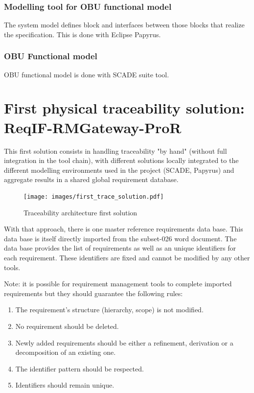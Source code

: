 \documentclass[11pt]{template/openetcs_report}
\begin{document}
\subsection{Modelling tool for OBU functional model}
The system model defines block and interfaces between those blocks that realize
the specification. This is done with Eclipse Papyrus. 

\subsection{OBU Functional model}
\label{sec-10}
OBU functional model is done with SCADE suite tool.

\chapter{First physical traceability solution: ReqIF-RMGateway-ProR}
\label{sec-5}

This first solution consists in handling traceability "by hand" (without full integration in the tool chain), with different solutions locally integrated to the different modelling environments used in the project (SCADE, Papyrus) and aggregate results in a shared global requirement database.

\begin{figure}[htb]
\centering
\texttt{[image: images/first\_trace\_solution.pdf]}
\caption{\label{fig:trace_first}Traceability architecture first solution}
\end{figure}

With that approach, there is one master reference requirements data base. This data
base is itself directly imported from the subset-026 word document. The data
base provides the list of requirements as well as an unique identifiers for each
requirement. These identifiers are fixed and cannot be modified by any other
tools. 

Note: it is possible for requirement management tools to complete imported
requirements but they should guarantee the following rules:
\begin{enumerate}
\item The requirement's structure (hierarchy, scope) is not modified.
\item No requirement should be deleted.
\item Newly added requirements should be either a refinement, derivation or a decomposition of an existing one.
\item The identifier pattern should be respected.
\item Identifiers should remain unique.
\end{enumerate}
\end{document}
